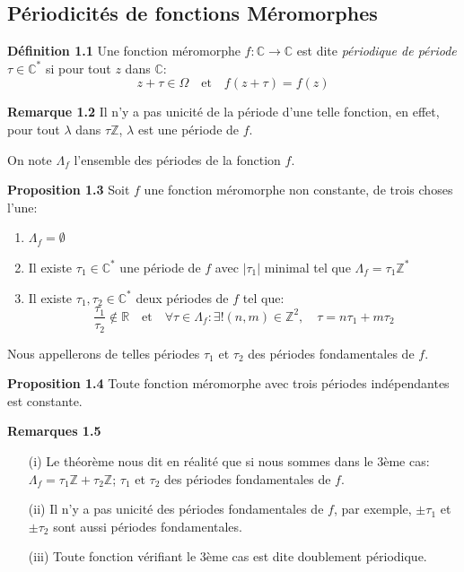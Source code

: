 \documentclass{article}
\begin{document}
\subsection{Périodicités de fonctions Méromorphes }
\textbf{Définition 1.1} \quad Une fonction méromorphe \( f: \mathbb{C} \to \mathbb{C} \) est dite \textit{périodique de période} \( \tau \in \mathbb{C}^* \) si pour tout \( z \) dans \( \mathbb{C} \):
\[ z + \tau \in \Omega \quad \text{et} \quad f(z + \tau) = f(z) \]


\textbf{Remarque 1.2} \quad Il n'y a pas unicité de la période d'une telle fonction, en effet, pour tout \( \lambda \) dans \(  \tau  \mathbb{Z} \), \( \lambda\) est une période de \( f \).


On note \( \Lambda_f \) l'ensemble des périodes de la fonction \( f \).

\textbf{Proposition 1.3} \quad Soit \( f \) une fonction méromorphe non constante, de trois choses l'une:
\begin{enumerate}
    \item \( \Lambda_f = \emptyset \)
    \item Il existe \( \tau_1 \in \mathbb{C}^* \) une période de \( f \) avec \( |\tau_1| \) minimal tel que \( \Lambda_f = \tau_1 \mathbb{Z}^* \)
    \item Il existe \( \tau_1, \tau_2 \in \mathbb{C}^* \) deux périodes de \( f \) tel que:
    \[
\frac{\tau_1}{\tau_2} \notin \mathbb{R} \quad \text{et} \quad \forall \tau \in \Lambda_f:  \exists! (n, m) \in \mathbb{Z}^2, \quad \tau = n\tau_1 + m\tau_2
\]
\end{enumerate}
Nous appellerons de telles périodes \( \tau_1 \) et \( \tau_2 \) des périodes fondamentales de \( f \).



\textbf{Proposition 1.4} \quad Toute fonction méromorphe avec trois périodes indépendantes est constante.


\textbf{Remarques 1.5}
\begin{itemize}
    \item[(i)] Le théorème nous dit en réalité que si nous sommes dans le 3ème cas: \( \Lambda_f = \tau_1 \mathbb{Z} + \tau_2 \mathbb{Z} \); \( \tau_1 \) et \( \tau_2 \) des périodes fondamentales de \( f \).
    \item[(ii)] Il n'y a pas unicité des périodes fondamentales de \( f \), par exemple, \( \pm \tau_1 \) et \( \pm \tau_2 \) sont aussi périodes fondamentales.
    \item[(iii)] Toute fonction vérifiant le 3ème cas est dite doublement périodique.
\end{itemize}
\end{document}
